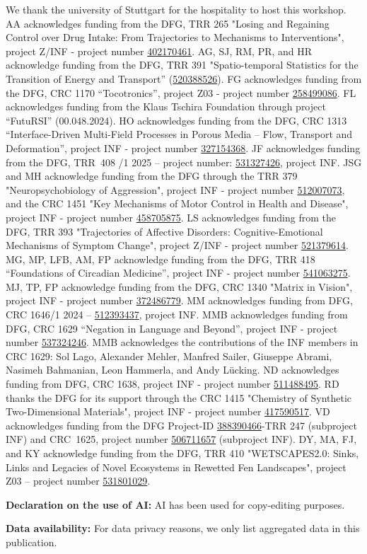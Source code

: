 \documentclass{eceasst}
\newcommand{\geprislink}[1]{\href{https://gepris.dfg.de/gepris/projekt/#1?language=en}{#1}}
\newenvironment{aiuse}{%
  \par\vspace{11pt}%
  \noindent\textbf{Declaration on the use of AI:}\enspace}{%
  \par\vspace{11pt}}
\newenvironment{data}{%
  \par\vspace{11pt}%
  \noindent\textbf{Data availability:}\enspace}{%
  \par\vspace{11pt}}
\begin{document}
\begin{acknowledge}
We thank the university of Stuttgart for the hospitality to host this workshop.
AA acknowledges funding from the DFG, TRR 265 "Losing and Regaining Control over Drug Intake: From Trajectories to Mechanisms to Interventions", project  Z/INF - project number \geprislink{402170461}.
AG, SJ, RM, PR, and HR acknowledge funding from the DFG, TRR 391 "Spatio-temporal Statistics for the Transition of Energy and Transport'' (\geprislink{520388526}).
FG acknowledges funding from the DFG, CRC 1170 “Tocotronics”, project Z03 - project number \geprislink{258499086}.
FL acknowledges funding from the Klaus Tschira Foundation through project “FutuRSI” (00.048.2024).
HO acknowledges funding from the DFG, CRC 1313 “Interface-Driven Multi-Field Processes in Porous Media – Flow, Transport and Deformation”, project INF - project number \geprislink{327154368}.
JF acknowledges funding from the DFG, TRR~408 /1 2025 – project number: \geprislink{531327426}, project INF.
JSG and MH acknowledge funding from the DFG through the TRR 379 "Neuropsychobiology of Aggression", project INF - project number \geprislink{512007073}, and the CRC 1451 "Key Mechanisms of Motor Control in Health and Disease", project INF - project number \geprislink{458705875}.
LS acknowledges funding from the DFG, TRR 393 "Trajectories of Affective Disorders: Cognitive-Emotional Mechanisms of Symptom Change", project  Z/INF - project number \geprislink{521379614}.
MG, MP, LFB, AM, FP acknowledge funding from the DFG, TRR 418 ``Foundations of Circadian Medicine'', project INF - project number \geprislink{541063275}.
MJ, TP, FP acknowledge funding from the DFG, CRC 1340 "Matrix in Vision", project INF - project number \geprislink{372486779}.
MM acknowledges funding from DFG, CRC 1646/1 2024 -- \geprislink{512393437}, project INF.
MMB acknowledges funding from DFG, CRC 1629 ``Negation in Language and Beyond'', project INF - project number \geprislink{537324246}.
MMB acknowledges the contributions of the INF members in CRC 1629: Sol Lago, Alexander Mehler, Manfred Sailer, Giuseppe Abrami, Nasimeh Bahmanian, Leon Hammerla, and Andy Lücking.
ND acknowledges funding from DFG, CRC 1638, project INF - project number \geprislink{511488495}.
RD thanks the DFG for its support through the CRC 1415 "Chemistry of Synthetic Two-Dimensional Materials", project INF - project number \geprislink{417590517}.
VD acknowledges funding from the DFG Project-ID \geprislink{388390466}-TRR 247 (subproject INF) and CRC~1625, project number \geprislink{506711657} (subproject INF).
DY, MA, FJ, and KY acknowledge funding from the DFG, TRR 410 "WETSCAPES2.0: Sinks, Links and Legacies of Novel Ecosystems in Rewetted Fen Landscapes", project Z03 -- project number \geprislink{531801029}.
\end{acknowledge}

\begin{aiuse}
AI has been used for copy-editing purposes.
\end{aiuse}

\begin{data}
For data privacy reasons, we only list aggregated data in this publication.
\end{data}



\end{document}
